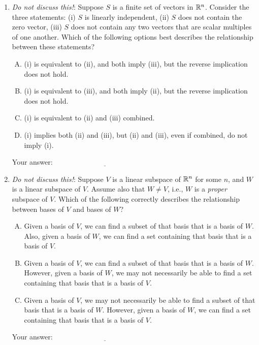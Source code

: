 \documentclass[10pt]{amsart}
\begin{document}
\begin{enumerate}
\item {\em Do not discuss this!}: Suppose $S$ is a finite set of
  vectors in $\mathbb{R}^n$. Consider the three statements: (i) $S$ is
  linearly independent, (ii) $S$ does not contain the zero vector,
  (iii) $S$ does not contain any two vectors that are scalar multiples
  of one another. Which of the following options best describes the
  relationship between these statements?

  \begin{enumerate}[(A)]
  \item (i) is equivalent to (ii), and both imply (iii), but the
    reverse implication does not hold.
  \item (i) is equivalent to (iii), and both imply (ii), but the
    reverse implication does not hold.
  \item (i) is equivalent to (ii) and (iii) combined.
  \item (i) implies both (ii) and (iii), but (ii) and (iii), even if
    combined, do not imply (i).
  \end{enumerate}

  \vspace{0.1in}
  Your answer: $\underline{\qquad\qquad\qquad\qquad\qquad\qquad\qquad}$
  \vspace{0.1in}

\item {\em Do not discuss this!}: Suppose $V$ is a linear subspace of
  $\mathbb{R}^n$ for some $n$, and $W$ is a linear subspace of $V$. Assume
  also that $W \ne V$, i.e., $W$ is a {\em proper} subspace of
  $V$. Which of the following correctly describes the relationship
  between bases of $V$ and bases of $W$?

  \begin{enumerate}[(A)]
  \item Given a basis of $V$, we can find a subset of that basis that
    is a basis of $W$. Also, given a basis of $W$, we can find a set
    containing that basis that is a basis of $V$.
  \item Given a basis of $V$, we can find a subset of that basis that
    is a basis of $W$. However, given a basis of $W$, we may not
    necessarily be able to find a set containing that basis that is a
    basis of $V$.
  \item Given a basis of $V$, we may not necessarily be able to find a
    subset of that basis that is a basis of $W$. However, given a
    basis of $W$, we can find a set containing that basis that is a
    basis of $V$.
  \end{enumerate}

  \vspace{0.1in}
  Your answer: $\underline{\qquad\qquad\qquad\qquad\qquad\qquad\qquad}$
  \vspace{0.1in}

\end{enumerate}
\end{document}
